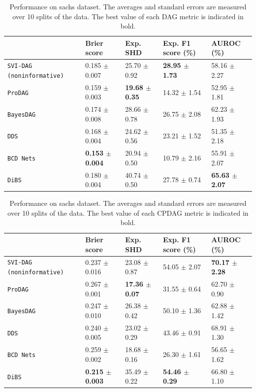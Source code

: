 \begin{table}[ht]
\centering
\caption{Performance on sachs dataset. The averages and standard errors are measured over 10 splits of the data. The best value of each DAG metric is indicated in bold.}
\label{tab:sachs_dag}
\small
\begin{tabularx}{\linewidth}{XXXXX}
\toprule
 & Brier score & Exp. SHD & Exp. F1 score (\%) & AUROC (\%) \\
\midrule
\texttt{SVI-DAG (noninformative)} & 0.185 $\pm$ 0.007 & 25.70 $\pm$ 0.92 & \textbf{28.95 $\pm$ 1.73} & 58.16 $\pm$ 2.27 \\
\texttt{ProDAG} & 0.159 $\pm$ 0.003 & \textbf{19.68 $\pm$ 0.35} & 14.32 $\pm$ 1.54 & 52.95 $\pm$ 1.81 \\
\texttt{BayesDAG} & 0.174 $\pm$ 0.008 & 28.66 $\pm$ 0.78 & 26.75 $\pm$ 2.08 & 62.23 $\pm$ 1.93 \\
\texttt{DDS} & 0.168 $\pm$ 0.004 & 24.62 $\pm$ 0.56 & 23.21 $\pm$ 1.52 & 51.35 $\pm$ 2.18 \\
\texttt{BCD Nets} & \textbf{0.153 $\pm$ 0.004} & 20.94 $\pm$ 0.50 & 10.79 $\pm$ 2.16 & 55.91 $\pm$ 2.07 \\
\texttt{DiBS} & 0.180 $\pm$ 0.004 & 40.74 $\pm$ 0.50 & 27.78 $\pm$ 0.74 & \textbf{65.63 $\pm$ 2.07} \\
\bottomrule
\end{tabularx}
\end{table}

\begin{table}[ht]
\centering
\caption{Performance on sachs dataset. The averages and standard errors are measured over 10 splits of the data. The best value of each CPDAG metric is indicated in bold.}
\label{tab:sachs_cpdag}
\small
\begin{tabularx}{\linewidth}{XXXXX}
\toprule
 & Brier score & Exp. SHD & Exp. F1 score (\%) & AUROC (\%) \\
\midrule
\texttt{SVI-DAG (noninformative)} & 0.237 $\pm$ 0.016 & 23.08 $\pm$ 0.87 & 54.05 $\pm$ 2.07 & \textbf{70.17 $\pm$ 2.28} \\
\texttt{ProDAG} & 0.267 $\pm$ 0.001 & \textbf{17.36 $\pm$ 0.07} & 31.55 $\pm$ 0.64 & 62.70 $\pm$ 0.90 \\
\texttt{BayesDAG} & 0.247 $\pm$ 0.010 & 26.38 $\pm$ 0.42 & 50.10 $\pm$ 1.36 & 62.88 $\pm$ 1.42 \\
\texttt{DDS} & 0.240 $\pm$ 0.005 & 23.02 $\pm$ 0.29 & 43.46 $\pm$ 0.91 & 68.91 $\pm$ 1.30 \\
\texttt{BCD Nets} & 0.259 $\pm$ 0.002 & 18.68 $\pm$ 0.16 & 26.30 $\pm$ 1.61 & 56.65 $\pm$ 1.62 \\
\texttt{DiBS} & \textbf{0.215 $\pm$ 0.003} & 35.49 $\pm$ 0.22 & \textbf{54.46 $\pm$ 0.29} & 66.80 $\pm$ 1.10 \\
\bottomrule
\end{tabularx}
\end{table}

